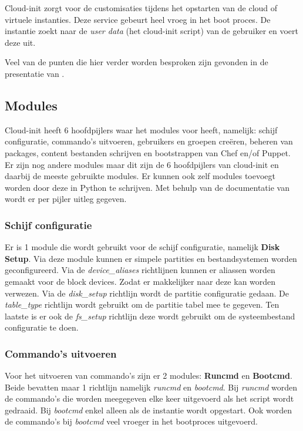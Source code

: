 Cloud-init zorgt  voor de customisaties tijdens het opstarten van de cloud of virtuele instanties. Deze service gebeurt heel vroeg in het boot proces. De instantie zoekt naar de \textit{user data} (het cloud-init script) van de gebruiker en voert deze uit. 

Veel van de punten die hier verder worden besproken zijn gevonden in de presentatie van \autocite{cloudred}.

\subsection{Modules}
Cloud-init heeft 6 hoofdpijlers waar het modules voor heeft, namelijk: schijf configuratie, commando's uitvoeren, gebruikers en groepen creëren, beheren van packages, content bestanden schrijven en bootstrappen van Chef en/of Puppet. Er zijn nog andere modules maar dit zijn de 6 hoofdpijlers van cloud-init en daarbij de meeste gebruikte modules. Er kunnen ook zelf modules toevoegt worden door deze in Python te schrijven. Met behulp van de documentatie van \autocite{clouddocs} wordt er per pijler uitleg gegeven.

\subsubsection{Schijf configuratie}
Er is 1 module die wordt gebruikt voor de schijf configuratie, namelijk \textbf{Disk Setup}. Via deze module kunnen er simpele partities en bestandsystemen worden geconfigureerd. Via de \textit{device\_aliases} richtlijnen kunnen er aliassen worden gemaakt voor de block devices. Zodat er makkelijker naar deze kan worden verwezen. Via de \textit{disk\_setup} richtlijn wordt de partitie configuratie gedaan. De \textit{table\_type} richtlijn wordt gebruikt om de partitie tabel mee te gegeven. Ten laatste is er ook de \textit{fs\_setup} richtlijn deze wordt gebruikt om de systeembestand configuratie te doen.

\subsubsection{Commando's uitvoeren}
Voor het uitvoeren van commando's zijn er 2 modules: \textbf{Runcmd} en \textbf{Bootcmd}. Beide bevatten maar 1 richtlijn namelijk \textit{runcmd} en \textit{bootcmd}. Bij \textit{runcmd} worden de commando's die worden meegegeven elke keer uitgevoerd als het script wordt gedraaid. Bij \textit{bootcmd} enkel alleen als de instantie wordt opgestart. Ook worden de commando's bij \textit{bootcmd} veel vroeger in het bootproces uitgevoerd.

